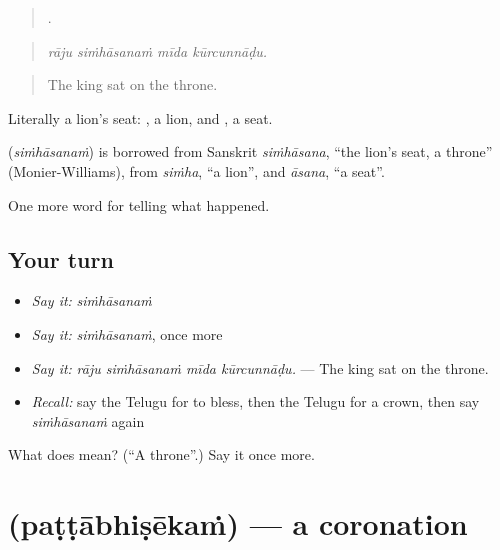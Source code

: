\begin{quote}
   .
\end{quote}

\begin{quote}
\emph{rāju siṁhāsanaṁ mīda kūrcunnāḍu.}
\end{quote}

\begin{quote}
The king sat on the throne.
\end{quote}

Literally a lion's seat: , a lion, and , a seat.

\begin{cousinweb}
\textbf{} (\emph{siṁhāsanaṁ}) is borrowed from Sanskrit \emph{siṁhāsana}, \textquotedblleft{}the lion's seat, a throne\textquotedblright{} (Monier-Williams), from \emph{siṁha}, \textquotedblleft{}a lion\textquotedblright{}, and \emph{āsana}, \textquotedblleft{}a seat\textquotedblright{}.
\end{cousinweb}

\begin{grammarlens}[title={What you've built}]
One more word for telling what happened.
\end{grammarlens}

\subsection*{Your turn}
\begin{itemize}
\raggedright
  \item \emph{Say it:} \emph{siṁhāsanaṁ}
  \item \emph{Say it:} \emph{siṁhāsanaṁ}, once more
  \item \emph{Say it:} \emph{rāju siṁhāsanaṁ mīda kūrcunnāḍu.} — The king sat on the throne.
  \item \emph{Recall:} say the Telugu for to bless, then the Telugu for a crown, then say \emph{siṁhāsanaṁ} again
\end{itemize}

\begin{tcolorbox}[breakable,colback=teal!4,colframe=teal!35!black,title={Before you move on}]
What does  mean? (\textquotedblleft{}A throne\textquotedblright{}.) Say it once more.
\end{tcolorbox}
\section[\texorpdfstring{\te{పట్టాభిషేకం} (paṭṭābhiṣēkaṁ)}{పట్టాభిషేకం (paṭṭābhiṣēkaṁ)}]{ (paṭṭābhiṣēkaṁ) — a coronation}

